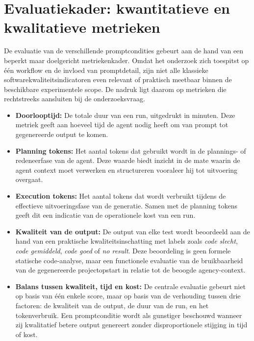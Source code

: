 \section{Evaluatiekader: kwantitatieve en kwalitatieve metrieken}
\label{sec:kwaliteitsmeting}

De evaluatie van de verschillende promptcondities gebeurt aan de hand van een beperkt maar doelgericht metriekenkader. Omdat het onderzoek zich toespitst op één workflow en de invloed van promptdetail, zijn niet alle klassieke softwarekwaliteitsindicatoren even relevant of praktisch meetbaar binnen de beschikbare experimentele scope. De nadruk ligt daarom op metrieken die rechtstreeks aansluiten bij de onderzoeksvraag.

\begin{itemize}
\item \textbf{Doorlooptijd:} De totale duur van een run, uitgedrukt in minuten. Deze metriek geeft aan hoeveel tijd de agent nodig heeft om van prompt tot gegenereerde output te komen.

\item \textbf{Planning tokens:} Het aantal tokens dat gebruikt wordt in de plannings- of redeneerfase van de agent. Deze waarde biedt inzicht in de mate waarin de agent context moet verwerken en structureren vooraleer hij tot uitvoering overgaat.

\item \textbf{Execution tokens:} Het aantal tokens dat wordt verbruikt tijdens de effectieve uitvoeringsfase van de generatie. Samen met de planning tokens geeft dit een indicatie van de operationele kost van een run.

\item \textbf{Kwaliteit van de output:} De output van elke test wordt beoordeeld aan de hand van een praktische kwaliteitsinschatting met labels zoals \textit{code slecht}, \textit{code gemiddeld}, \textit{code goed} of \textit{no result}. Deze beoordeling is geen formele statische code-analyse, maar een functionele evaluatie van de bruikbaarheid van de gegenereerde projectopstart in relatie tot de beoogde agency-context.

\item \textbf{Balans tussen kwaliteit, tijd en kost:} De centrale evaluatie gebeurt niet op basis van één enkele score, maar op basis van de verhouding tussen drie factoren: de kwaliteit van de output, de duur van de run, en het tokenverbruik. Een promptconditie wordt als gunstiger beschouwd wanneer zij kwalitatief betere output genereert zonder disproportionele stijging in tijd of kost.
\end{itemize}

